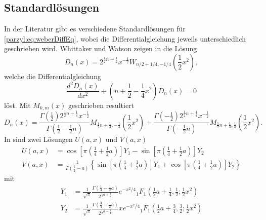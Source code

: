 \subsection{Standardlösungen}
In der Literatur gibt es verschiedene Standardlösungen für 
\eqref{parzyl:eq:weberDiffEq}, wobei die Differentialgleichung jeweils 
unterschiedlich geschrieben wird.
Whittaker und Watson zeigen in \cite{parzyl:whittaker} die Lösung
\begin{equation}
    D_n(x) = 2^{\frac{1}{2}n + \frac{1}{2}} x^{-\frac{1}{2}} W_{n/2 + 1/4, -1/4}\left(\frac{1}{2}x^2\right),
\end{equation}
welche die Differentialgleichung
\begin{equation}
    \frac{d^2D_n(x)}{dx^2} + \left(n + \frac{1}{2} - \frac{1}{4} x^2\right)D_n(x) = 0
\end{equation}
löst.
Mit $M_{k,m}(x)$ geschrieben resultiert
\begin{equation}
    D_n(x) = \frac{
            \Gamma \left( {\textstyle \frac{1}{2}}\right) 2^{\frac{1}{2}n + \frac{1}{4}} x^{-\frac{1}{2}}
        }{
            \Gamma \left( {\textstyle \frac{1}{2}} - {\textstyle \frac{1}{2}} n \right)
        }
        M_{\frac{1}{2} n + \frac{1}{4}, - \frac{1}{4}} \left(\frac{1}{2}x^2\right)
        +
        \frac{
            \Gamma\left(-{\textstyle \frac{1}{2}}\right) 2^{\frac{1}{2}n + \frac{1}{4}} x^{-\frac{1}{2}}
        }{
            \Gamma\left(- {\textstyle \frac{1}{2}} n\right)
        }
        M_{\frac{1}{2} n + \frac{1}{4}, \frac{1}{4}} \left(\frac{1}{2}x^2\right).
\end{equation}
In \cite{parzyl:abramowitz-stegun} sind zwei Lösungen $U(a, x)$ und $V(a,x)$ 
\begin{align}
    U(a,x) &= 
    \cos\left[\pi \left({\textstyle \frac{1}{4}} + {\textstyle \frac{1}{2}} a\right)\right] Y_1
    - \sin\left[\pi \left({\textstyle \frac{1}{4}} + {\textstyle \frac{1}{2}} a\right)\right] Y_2 
    \label{parzyl:eq:Uaz}
    \\
    V(a,x) &= \frac{1}{\Gamma \left({\textstyle \frac{1}{2} - a}\right)} \left\{
    \sin\left[\pi \left({\textstyle \frac{1}{4}} + {\textstyle \frac{1}{2}} a\right)\right] Y_1
    + \cos\left[\pi \left({\textstyle \frac{1}{4}} + {\textstyle \frac{1}{2}} a\right)\right] Y_2
    \right\}
    \label{parzyl:eq:Vaz}
\end{align}
mit
\begin{align}
    Y_1 &= \frac{1}{\sqrt{\pi}} 
            \frac{\Gamma\left({\textstyle \frac{1}{4} - 
            {\textstyle \frac{1}{2}}a}\right)}
            {2^{\frac{1}{2} a + \frac{1}{4}}}
            e^{-x^2/4} 
            {}_{1} F_{1}
                \left({\textstyle \frac{1}{2}}a + {\textstyle \frac{1}{4}}, 
                {\textstyle \frac{1}{2}} ; 
                {\textstyle \frac{1}{2}}x^2\right)\\
        Y_2 &= \frac{1}{\sqrt{\pi}} 
            \frac{\Gamma\left({\textstyle \frac{3}{4} - 
            {\textstyle \frac{1}{2}}a}\right)}
            {2^{\frac{1}{2} a - \frac{1}{4}}} 
            x e^{-x^2/4} 
            {}_{1} F_{1}
                \left({\textstyle \frac{1}{2}}a + {\textstyle \frac{3}{4}}, 
                {\textstyle \frac{3}{2}} ; 
                {\textstyle \frac{1}{2}}x^2\right)
\end{align}
